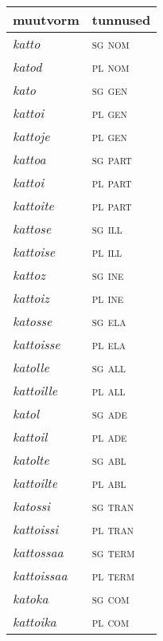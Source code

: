 \documentclass[12pt,a4paper]{article}
\begin{document}
\begin{table}[H] %
      \footnotesize
  \begin{minipage}[t]{.40\textwidth}
    \begin{tabular}[t]{l l}
      muutvorm            & tunnused \\ \hline
      \textit{katto}      & \textsc{sg nom} \\
      \textit{katod}      & \textsc{pl nom} \\
      \textit{kato}       & \textsc{sg gen} \\
      \textit{kattoi}     & \textsc{pl gen} \\
      \textit{kattoje}    & \textsc{pl gen} \\
      \textit{kattoa}     & \textsc{sg part} \\
      \textit{kattoi}     & \textsc{pl part} \\
      \textit{kattoite}   & \textsc{pl part} \\
      \textit{kattose}    & \textsc{sg ill} \\
      \textit{kattoise}   & \textsc{pl ill} \\
      \textit{kattoz}     & \textsc{sg ine} \\
      \textit{kattoiz}    & \textsc{pl ine} \\
      \textit{katosse}    & \textsc{sg ela} \\
      \textit{kattoisse}  & \textsc{pl ela} \\
      \textit{katolle}    & \textsc{sg all} \\
      \textit{kattoille}  & \textsc{pl all} \\
      \textit{katol}      & \textsc{sg ade} \\
      \textit{kattoil}    & \textsc{pl ade} \\
      \textit{katolte}    & \textsc{sg abl} \\
      \textit{kattoilte}  & \textsc{pl abl} \\
      \textit{katossi}    & \textsc{sg tran} \\
      \textit{kattoissi}  & \textsc{pl tran} \\
      \textit{kattossaa}  & \textsc{sg term} \\
      \textit{kattoissaa} & \textsc{pl term} \\
      \textit{katoka}     & \textsc{sg com} \\
      \textit{kattoika}   & \textsc{pl com} \\

\end{tabular}
\end{minipage}
\end{table}
\end{document}
